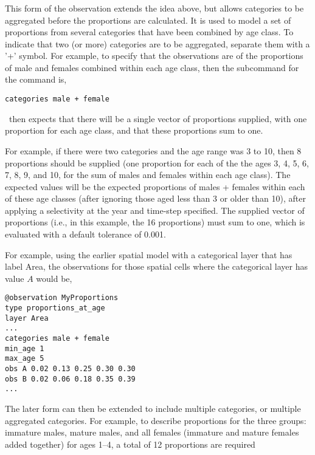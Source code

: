 {{{{\subsubsection*{}

This form of the observation extends the idea above, but allows categories to be aggregated before the proportions are calculated. It is used to model a set of proportions from several categories that have been combined by age class. To indicate that two (or more) categories are to be aggregated, separate them with a '+' symbol. For example, to specify that the observations are of the proportions of male and females combined within each age class, then the subcommand  for the  command is,

{\small{\begin{verbatim}
categories male + female
\end{verbatim}}}

\iSAM\ then expects that there will be a single vector of proportions supplied, with one proportion for each age class, and that these proportions sum to one. 

For example, if there were two categories and the age range was 3 to 10, then 8 proportions should be supplied (one proportion for each of the the ages 3, 4, 5, 6, 7, 8, 9, and 10, for the sum of males and females within each age class). The expected values will be the expected proportions of males + females within each of these age classes (after ignoring those aged less than 3 or older than 10), after applying a selectivity at the year and time-step specified. The supplied vector of proportions (i.e., in this example, the 16 proportions) must sum to one, which is evaluated with a default tolerance of 0.001. 

For example, using the earlier spatial model with a categorical layer that has label Area, the observations for those spatial cells where the categorical layer has value $A$ would be, 

{\small{\begin{verbatim}
@observation MyProportions
type proportions_at_age
layer Area
...
categories male + female
min_age 1
max_age 5
obs A 0.02 0.13 0.25 0.30 0.30
obs B 0.02 0.06 0.18 0.35 0.39
...
\end{verbatim}

The later form can then be extended to include multiple categories, or multiple aggregated categories. For example, to describe proportions for the three groups: immature males, mature males, and all females (immature and mature females added together) for ages 1--4, a total of 12 proportions are required 

}}}}}}
